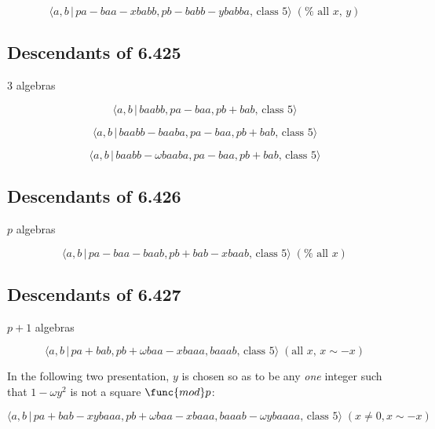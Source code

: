 \documentclass[10pt]{article}
\begin{document}
\begin{equation}
\langle a,b\,|\,pa-baa-xbabb,pb-babb-ybabba,\,\text{class }5\rangle \;(\text{%
all }x,\,y)  \tag{7.485}
\end{equation}

\subsection{Descendants of 6.425}

3 algebras

\begin{equation}
\langle a,b\,|\,baabb,pa-baa,pb+bab,\,\text{class }5\rangle  \tag{7.486}
\end{equation}

\begin{equation}
\langle a,b\,|\,baabb-baaba,pa-baa,pb+bab,\,\text{class }5\rangle 
\tag{7.487}
\end{equation}

\begin{equation}
\langle a,b\,|\,baabb-\omega baaba,pa-baa,pb+bab,\,\text{class }5\rangle 
\tag{7.488}
\end{equation}

\subsection{Descendants of 6.426}

$p$ algebras

\begin{equation}
\langle a,b\,|\,pa-baa-baab,pb+bab-xbaab,\,\text{class }5\rangle \;(\text{%
all }x)  \tag{7.489}
\end{equation}

\subsection{Descendants of 6.427}

$p+1$ algebras

\begin{equation}
\langle a,b\,|\,pa+bab,pb+\omega baa-xbaaa,baaab,\,\text{class }5\rangle \;(%
\text{all }x,\,x\sim -x)  \tag{7.490}
\end{equation}

In the following two presentation, $y$ is chosen so as to be any \emph{one}
integer such that $1-\omega y^{2}$ is not a square $\func{mod}p$:

\begin{equation}
\langle a,b\,|\,pa+bab-xybaaa,pb+\omega baa-xbaaa,baaab-\omega ybaaaa,\,%
\text{class }5\rangle \;(x\neq 0,x\sim -x)  \tag{7.491}
\end{equation}
\end{document}
